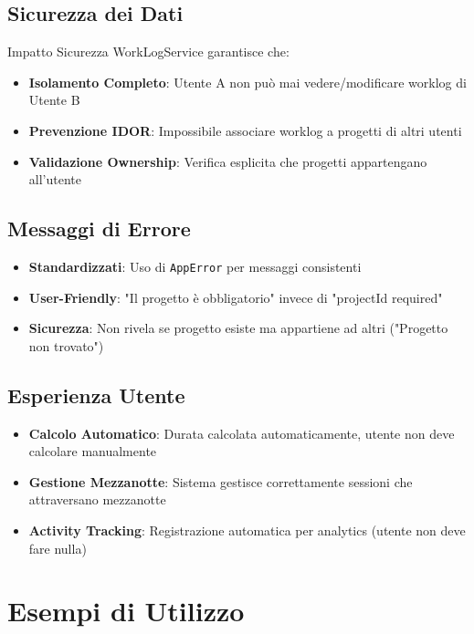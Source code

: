 \documentclass[11pt,a4paper]{article}
\begin{document}
\subsection{Sicurezza dei Dati}

\begin{importantbox}{Impatto Sicurezza}
WorkLogService garantisce che:
\begin{itemize}
    \item \textbf{Isolamento Completo}: Utente A non può mai vedere/modificare worklog di Utente B
    \item \textbf{Prevenzione IDOR}: Impossibile associare worklog a progetti di altri utenti
    \item \textbf{Validazione Ownership}: Verifica esplicita che progetti appartengano all'utente
\end{itemize}
\end{importantbox}

\subsection{Messaggi di Errore}

\begin{itemize}
    \item \textbf{Standardizzati}: Uso di \texttt{AppError} per messaggi consistenti
    \item \textbf{User-Friendly}: "Il progetto è obbligatorio" invece di "projectId required"
    \item \textbf{Sicurezza}: Non rivela se progetto esiste ma appartiene ad altri ("Progetto non trovato")
\end{itemize}

\subsection{Esperienza Utente}

\begin{itemize}
    \item \textbf{Calcolo Automatico}: Durata calcolata automaticamente, utente non deve calcolare manualmente
    \item \textbf{Gestione Mezzanotte}: Sistema gestisce correttamente sessioni che attraversano mezzanotte
    \item \textbf{Activity Tracking}: Registrazione automatica per analytics (utente non deve fare nulla)
\end{itemize}

\section{Esempi di Utilizzo}
\end{document}
